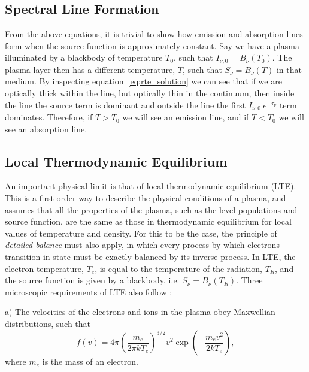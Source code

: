 


\subsection{Spectral Line Formation}

From the above equations, it is trivial to show how emission and absorption lines form when
the source function is approximately constant.
Say we have a plasma illuminated by a blackbody of temperature $T_0$, such that
$I_{\nu,0} = B_\nu (T_0)$. The plasma layer then has a different temperature, $T$,
such that $S_\nu = B_\nu (T)$ in that medium. By inspecting equation~\ref{eq:rte_solution}
we can see that if we are optically thick within the line, but optically
thin in the continuum, then inside the line the source term is dominant and outside 
the line the first $I_{\nu,0}~e^{-\tau_\nu}$ term dominates. Therefore, if $T > T_0$ we will 
see an emission line, and if $T < T_0$ we will see an absorption line. 

\subsection{Local Thermodynamic Equilibrium}
\label{sec:lte}


An important physical limit is that of local thermodynamic equilibrium (LTE).
This is a first-order way to describe the physical conditions of a plasma, and assumes
that all the properties of the plasma, such as the level populations and source function,
are the same as those in thermodynamic equilibrium for local values of 
temperature and density. For this to be the case, the principle of 
{\em detailed balance} must also apply, in which every 
process by which electrons transition in state must be exactly 
balanced by its inverse process. In LTE, the electron temperature, 
$T_e$, is equal to the temperature of the radiation, $T_R$, and
the source function is given by a blackbody, i.e. $S_\nu = B_\nu (T_R)$.
Three microscopic requirements of LTE also follow \citep{mihalas}:

a) The velocities of the electrons and ions in the plasma obey Maxwellian
distributions, such that
\begin{equation}
f(v) = 4 \pi \left( \frac{m_e}{2 \pi kT_e} \right)^{3/2} v^2 
\exp \left( - \frac{m_ev^2}{2kT_e} \right),
\label{eq:maxwellian}
\end{equation}
where $m_e$ is the mass of an electron.

